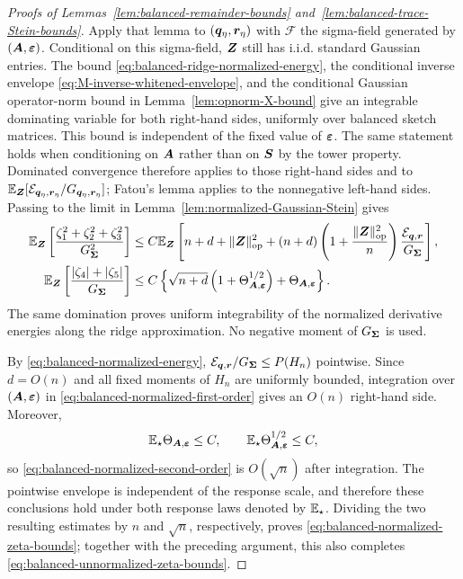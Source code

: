 \documentclass{article}
\theoremstyle{plain} %
\theoremstyle{definition} %
\theoremstyle{definition} %
\begin{document}
\begin{proof}[Proofs of Lemmas~\ref{lem:balanced-remainder-bounds}
and~\ref{lem:balanced-trace-Stein-bounds}]
Apply that lemma to $(\boldsymbol{q}_\eta,\boldsymbol{r}_\eta)$ with
$\mathcal F$ the sigma-field generated by $(\boldsymbol{A},{\boldsymbol{\varepsilon} })$.  Conditional on this
sigma-field, $\boldsymbol{Z}$ still has i.i.d. standard Gaussian entries.  The bound
\eqref{eq:balanced-ridge-normalized-energy},
the conditional inverse envelope
\eqref{eq:M-inverse-whitened-envelope}, and the conditional Gaussian
operator-norm bound in Lemma~\ref{lem:opnorm-X-bound} give an integrable
dominating variable for both right-hand sides, uniformly over balanced
sketch matrices. This bound is independent of the fixed value of
${\boldsymbol{\varepsilon} }$. The same statement holds when
conditioning on $\boldsymbol{A}$ rather than on $\boldsymbol{S}$ by the tower property.
Dominated convergence therefore applies to those right-hand sides and to
${\mathbb{E}}_{\boldsymbol{Z}}[{\mathcal E}_{\boldsymbol{q}_\eta,\boldsymbol{r}_\eta}/G_{\boldsymbol{q}_\eta,\boldsymbol{r}_\eta}]$;
Fatou's lemma applies to the nonnegative
left-hand sides. Passing to the limit in
Lemma~\ref{lem:normalized-Gaussian-Stein} gives
\begin{align}
    {\mathbb{E}}_{\boldsymbol{Z}}\left[
       \frac{\zeta_1^2+\zeta_2^2+\zeta_3^2}{G_{\boldsymbol{\Sigma}}^2}
    \right]
    &\leq C{\mathbb{E}}_{\boldsymbol{Z}}\left[
       n+d+\lVert\boldsymbol{Z}\rVert_{\rm op}^2
       +(n+d)\left(1+\frac{\lVert\boldsymbol{Z}\rVert_{\rm op}^2}{n}\right)
          \frac{{\mathcal E}_{\boldsymbol{q},\boldsymbol{r}}}{G_{\boldsymbol{\Sigma}}}
    \right],
    \label{eq:balanced-normalized-first-order}\\
    {\mathbb{E}}_{\boldsymbol{Z}}\left[
       \frac{|\zeta_4|+|\zeta_5|}{G_{\boldsymbol{\Sigma}}}
    \right]
    &\leq C\left\{
       \sqrt{n+d}\left(1+\Theta_{\boldsymbol{A},{\boldsymbol{\varepsilon} }}^{1/2}\right)
       +\Theta_{\boldsymbol{A},{\boldsymbol{\varepsilon} }}
    \right\}.
    \label{eq:balanced-normalized-second-order}
\end{align}
The same domination proves uniform integrability of the normalized derivative
energies along the ridge approximation.  No negative moment of
$G_{\boldsymbol{\Sigma}}$ is used.

By \eqref{eq:balanced-normalized-energy},
${\mathcal E}_{\boldsymbol{q},\boldsymbol{r}}/G_{\boldsymbol{\Sigma}}\leq P(H_n)$ pointwise.
Since $d=O(n)$ and all fixed
moments of $H_n$ are uniformly bounded, integration over $(\boldsymbol{A},{\boldsymbol{\varepsilon} })$ in
\eqref{eq:balanced-normalized-first-order} gives an $O(n)$ right-hand side.
Moreover,
\begin{align*}
    {\mathbb{E}}_\star\Theta_{\boldsymbol{A},{\boldsymbol{\varepsilon} }}\leq C,
    \qquad
    {\mathbb{E}}_\star\Theta_{\boldsymbol{A},{\boldsymbol{\varepsilon} }}^{1/2}\leq C,
\end{align*}
so \eqref{eq:balanced-normalized-second-order} is $O(\sqrt n)$ after
integration.  The pointwise envelope is independent of the response scale,
and therefore these conclusions hold under both response laws denoted by
${\mathbb{E}}_\star$.  Dividing the two resulting estimates by $n$ and $\sqrt n$,
respectively, proves \eqref{eq:balanced-normalized-zeta-bounds}; together with
the preceding argument, this also completes
\eqref{eq:balanced-unnormalized-zeta-bounds}.


\end{proof}
\end{document}
